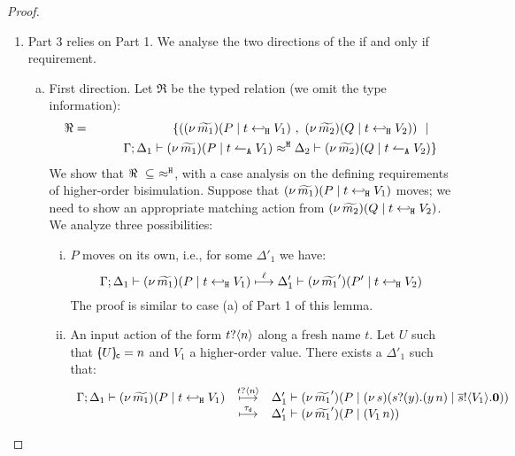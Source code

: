 \begin{proof}
\begin{enumerate}[$-$]
	\item Part 3 relies on Part 1. We analyse the two	directions of the if and only if requirement.
	\begin{enumerate}[(a)]
		\item First direction. Let $\Re$ be the typed relation (we omit the type information):
				\begin{eqnarray*}
					\Re &=&	\set{	(\newsp{\widetilde{m_1}}{P \Par \htrigger{t}{V_1}}\ ,\ 
									\newsp{\widetilde{m_2}}{Q \Par \htrigger{t}{V_2}}) \setbar\\
						&&
									\qquad \horel{\Gamma}{\Delta_1}{\newsp{\widetilde{m_1}}{P \Par \ntrigger{t}{V_1}  } }
									{\hwb}
									{\Delta_2}{\newsp{\widetilde{m_2}}{Q \Par \ntrigger{t}{V_2}  } }
					}
				\end{eqnarray*}
				We show that $\Re\ \subseteq\ \hwb$, with a case analysis on the defining requirements
				of higher-order bisimulation. Suppose that $(\nu\, \widetilde{m_1})(P \;|\; t \hookleftarrow_{\mathtt{H}} V_1)$ moves;
				we need to show an appropriate matching action from $(\nu\, \widetilde{m_2})(Q \;|\; t \hookleftarrow_{\mathtt{H}} V_2)$.
				We analyze three possibilities:
				\begin{enumerate}[i)]
					\item $P$ moves on its own, i.e., for some $\Delta'_1$ we have:
							\[
								\Gamma; \Delta_1 \vdash (\nu\, \widetilde{m_1})(P \;|\; t \hookleftarrow_{\mathtt{H}} V_1  )  \stackrel{\ell}{\longmapsto} \Delta_1' \vdash (\nu\, \widetilde{m_1}')(P' \;|\; t \hookleftarrow_{\mathtt{H}} V_2  )
							\]
							The proof is similar to case (a) of Part 1 of this lemma.
					\item	An input action of the form $t ? \langle n \rangle$ along a fresh name $t$.
							Let $U$ such that $[\!\!(U)\!\!]_{\mathsf{c}} = n$ and $V_1$ a higher-order value.  
							There exists a $\Delta'_1$ such that:
							$$
							\begin{array}{rcl}
							\Gamma; \Delta_1 \vdash (\nu\, \widetilde{m_1})(P \;|\; t \hookleftarrow_{\mathtt{H}} V_1  ) & \stackrel{t ? \langle n \rangle}{\longmapsto}& 
							\Delta_1' \vdash (\nu\, \widetilde{m_1}')(P \;|\; (\nu\, s)(s ? (y) . (y\, {n}) \;|\; \overline{s} ! \langle V_1 \rangle . \mathbf{0})) \\
							& \stackrel{\tau_{\mathsf{d}}}{\longmapsto} & 
								\Delta_1' \vdash (\nu\, \widetilde{m_1}')(P \;|\; (V_1\, {n}))
							\end{array}
							$$

\end{enumerate}
\end{enumerate}
\end{enumerate}
\end{proof}
